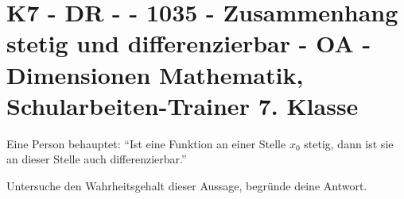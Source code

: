 \section{K7 - DR -  - 1035 - Zusammenhang stetig und differenzierbar - OA - Dimensionen Mathematik, Schularbeiten-Trainer 7. Klasse}

\begin{beispiel}[K7 - DR]{1} %
Eine Person behauptet: "`Ist eine Funktion an einer Stelle $x_0$ stetig, dann ist sie an dieser Stelle auch differenzierbar."'

Untersuche den Wahrheitsgehalt dieser Aussage, begründe deine Antwort.\leer

				\end{beispiel}
